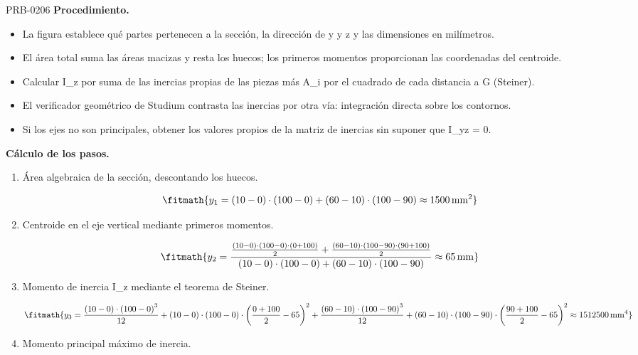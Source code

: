 \begin{studiumworked}{PRB-0206}
\textbf{Procedimiento.}\begin{itemize}\item La figura establece qué partes pertenecen a la sección, la dirección de y y z y las dimensiones en milímetros.
\item El área total suma las áreas macizas y resta los huecos; los primeros momentos proporcionan las coordenadas del centroide.
\item Calcular I\_z por suma de las inercias propias de las piezas más A\_i por el cuadrado de cada distancia a G (Steiner).
\item El verificador geométrico de Studium contrasta las inercias por otra vía: integración directa sobre los contornos.
\item Si los ejes no son principales, obtener los valores propios de la matriz de inercias sin suponer que I\_yz = 0.\end{itemize}

\textbf{Cálculo de los pasos.}

\begin{enumerate}

\item Área algebraica de la sección, descontando los huecos.

\[\fitmath{y_{1}=\left(10-0\right)\cdot \left(100-0\right)+\left(60-10\right)\cdot \left(100-90\right)\approx 1500\,\mathrm{mm^{2}}}\]

\item Centroide en el eje vertical mediante primeros momentos.

\[\fitmath{y_{2}=\frac{\frac{\left(10-0\right)\cdot \left(100-0\right)\cdot \left(0+100\right)}{2}+\frac{\left(60-10\right)\cdot \left(100-90\right)\cdot \left(90+100\right)}{2}}{\left(10-0\right)\cdot \left(100-0\right)+\left(60-10\right)\cdot \left(100-90\right)}\approx 65\,\mathrm{mm}}\]

\item Momento de inercia I\_z mediante el teorema de Steiner.

\[\fitmath{y_{3}=\frac{\left(10-0\right)\cdot {\left(100-0\right)}^{3}}{12}+\left(10-0\right)\cdot \left(100-0\right)\cdot {\left(\frac{0+100}{2}-65\right)}^{2}+\frac{\left(60-10\right)\cdot {\left(100-90\right)}^{3}}{12}+\left(60-10\right)\cdot \left(100-90\right)\cdot {\left(\frac{90+100}{2}-65\right)}^{2}\approx 1512500\,\mathrm{mm^{4}}}\]

\item Momento principal máximo de inercia.


\end{enumerate}
\end{studiumworked}
